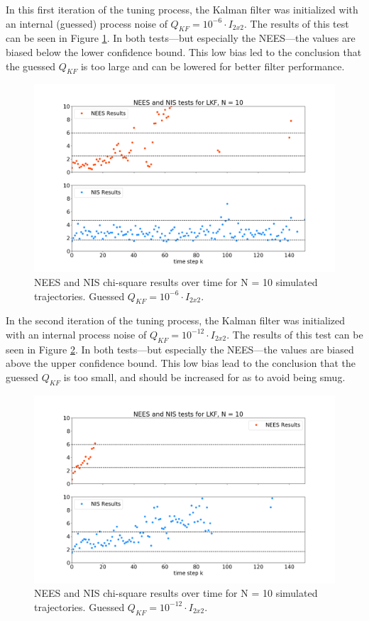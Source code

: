 \documentclass[11pt, a4paper]{article}
\begin{document}
In this first iteration of the tuning process, the Kalman filter was initialized with an internal (guessed) process noise of $Q_{KF} = 10^{-6} \cdot I_{2 x 2}$. 
The results of this test can be seen in Figure \ref{fig:neesnis_lkf_Qbig}. 
In both tests---but especially the NEES---the values are biased below the lower confidence bound. 
This low bias led to the conclusion that the guessed $Q_{KF}$ is too large and can be lowered for better filter performance. 
\begin{figure}[H]
	\centering
	\includegraphics[width=\textwidth]{Figures/NEESNIS_lkf_N10Q1.0E-06.png}
	\caption{NEES and NIS chi-square results over time for N = 10 simulated trajectories. Guessed $Q_{KF} = 10^{-6} \cdot I_{2 x 2}$.}
	\label{fig:neesnis_lkf_Qbig}
\end{figure}

In the second iteration of the tuning process, the Kalman filter was initialized with an internal process noise of $Q_{KF} = 10^{-12} \cdot I_{2 x 2}$. 
The results of this test can be seen in Figure \ref{fig:neesnis_lkf_Qsmall}. 
In both tests---but especially the NEES---the values are biased above the upper confidence bound. 
This low bias lead to the conclusion that the guessed $Q_{KF}$ is too small, and should be increased for as to avoid being smug. 
\begin{figure}[H]
	\centering
	\includegraphics[width=\textwidth]{Figures/NEESNIS_lkf_N10Q1.0E-12.png}
	\caption{NEES and NIS chi-square results over time for N = 10 simulated trajectories. Guessed $Q_{KF} = 10^{-12} \cdot I_{2 x 2}$.}
	\label{fig:neesnis_lkf_Qsmall}
\end{figure}
\end{document}
